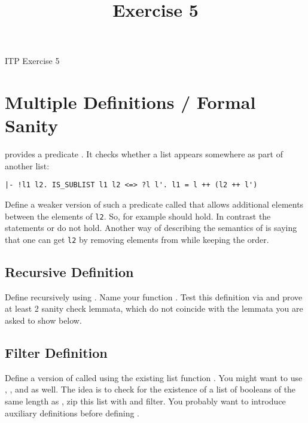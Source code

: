 \documentclass[a4paper,10pt,oneside]{scrartcl}
\title{Exercise 5}
\begin{document}
\begin{center}
ITP Exercise 5
\end{center}
\bigskip

\section{Multiple Definitions / Formal Sanity}

 provides a predicate . It checks whether
a list appears somewhere as part of another list:

\begin{center}
\begin{verbatim}
|- !l1 l2. IS_SUBLIST l1 l2 <=> ?l l'. l1 = l ++ (l2 ++ l')
\end{verbatim}
\end{center}

Define a weaker version of such a predicate called  that allows additional elements between
the elements of \texttt{l2}. So, for example  should hold. In contrast the statements  or  do not hold. Another way of describing the semantics of  is saying that one can get \texttt{l2} by removing elements from  while keeping the order.

\subsection{Recursive Definition}

Define  recursively using . Name your function . Test this definition via  and prove at least 2 sanity check lemmata, which do not coincide with the lemmata you are asked to show below.

\subsection{Filter Definition}

Define a version of  called  using the existing list function . You might want to use , ,  and  as well. The idea is to check for the existence of a list of booleans of the same length as , zip this list with  and filter. You probably want to introduce auxiliary definitions before defining .
\end{document}
